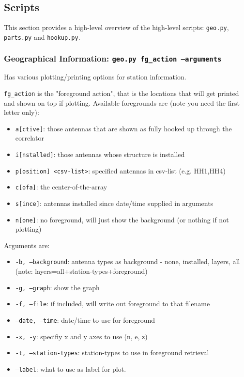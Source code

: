 \documentclass{article}
\begin{document}
\subsection{Scripts}
\label{sec:scripts}
This section provides a high-level overview of the high-level scripts:  {\tt geo.py},  {\tt parts.py} and {\tt hookup.py}.

\subsubsection{Geographical Information:  {\tt geo.py fg\_action --arguments}}

Has various plotting/printing options for station information.  {{\tt fg\_action} is the "foreground action", that is the locations that will get printed and shown on top if plotting.
Available foregrounds are (note you need the first letter only):
\begin{itemize}\setlength\itemsep{-.3em}
\item {\tt a[ctive]}:  those antennas that are shown as fully hooked up through the correlator
\item {\tt i[nstalled]}:  those antennas whose structure is installed
\item {\tt p[osition] <csv-list>}:  specified antennas in csv-list (e.g. HH1,HH4)
\item {\tt c[ofa]}:  the center-of-the-array
\item {\tt s[ince]}:  antennas installed since date/time supplied in arguments
\item {\tt n[one]}:  no foreground, will just show the background (or nothing if not plotting)
\end{itemize}

Arguments are:
\begin{itemize}\setlength\itemsep{-.3em}
\item {\tt -b, --background}:  antenna types as background - none, installed, layers, all (note:  layers=all+station-types+foreground)
\item {\tt -g, --graph}:  show the graph
\item {\tt -f, --file}: if included, will write out foreground to that filename
\item {\tt --date, --time}:  date/time to use for foreground
\item {\tt -x, -y}:  specifiy x and y axes to use (n, e, z)
\item {\tt -t, --station-types}:  station-types to use in foreground retrieval
\item {\tt --label}:  what to use as label for plot.
\end{itemize}

}
\end{document}

